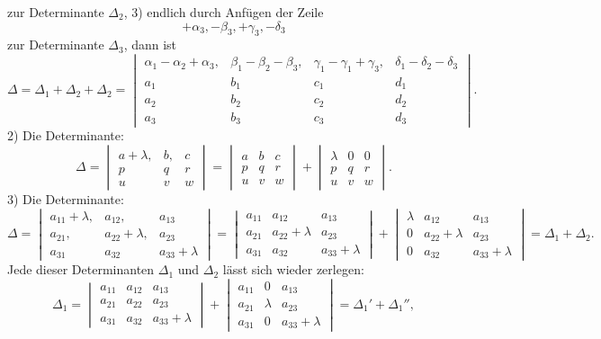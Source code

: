 \documentclass[11pt]{article}
\providecommand{\weberpage}[1]{}
\begin{document}
\weberpage{41}
zur Determinante $\varDelta_2$, 3) endlich durch Anfügen der Zeile
\[
+\alpha_3, - \beta_3, +\gamma_3, -\delta_3
\]
zur Determinante $\varDelta_3$, dann ist
\[
\varDelta = \varDelta_1+\varDelta_2+\varDelta_2 =
\begin{vmatrix}
\alpha_1-\alpha_2+\alpha_3, & \beta_1-\beta_2-\beta_3, & \gamma_1-\gamma_1+\gamma_3, & \delta_1-\delta_2-\delta_3\\
a_1 & b_1 & c_1 & d_1\\
a_2 & b_2 & c_2 & d_2\\
a_3 & b_3 & c_3 & d_3
\end{vmatrix}.
\]
2) Die Determinante:
\[
\varDelta = \begin{vmatrix} a+\lambda, & b, & c\\ p & q & r\\ u & v & w\end{vmatrix}
= \begin{vmatrix} a & b & c\\ p & q & r\\ u & v & w\end{vmatrix}
+ \begin{vmatrix} \lambda & 0 & 0\\ p & q & r\\ u & v & w\end{vmatrix}.
\]
3) Die Determinante:
\[
\varDelta = \begin{vmatrix} a_{11}+\lambda, & a_{12}, & a_{13}\\ a_{21}, & a_{22}+\lambda, & a_{23}\\ a_{31} & a_{32} & a_{33}+\lambda\end{vmatrix}
= \begin{vmatrix} a_{11} & a_{12} & a_{13}\\ a_{21} & a_{22}+\lambda & a_{23}\\ a_{31} & a_{32} & a_{33}+\lambda\end{vmatrix}
+ \begin{vmatrix} \lambda & a_{12} & a_{13}\\ 0 & a_{22}+\lambda & a_{23}\\ 0 & a_{32} & a_{33}+\lambda\end{vmatrix}
= \varDelta_1+\varDelta_2.
\]
Jede dieser Determinanten $\varDelta_1$ und $\varDelta_2$ lässt sich wieder zerlegen:
\[
\varDelta_1 = \begin{vmatrix} a_{11} & a_{12} & a_{13}\\ a_{21} & a_{22} & a_{23}\\ a_{31} & a_{32} & a_{33}+\lambda\end{vmatrix}
+ \begin{vmatrix} a_{11} & 0 & a_{13}\\ a_{21} & \lambda & a_{23}\\ a_{31} & 0 & a_{33}+\lambda\end{vmatrix}
= \varDelta_1'+\varDelta_1'',
\]
\end{document}
